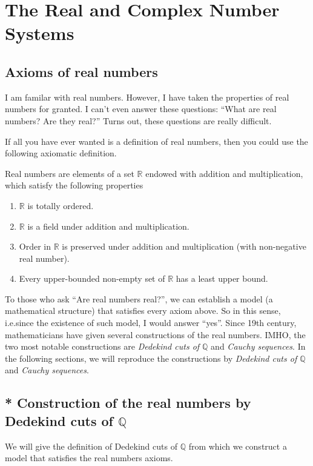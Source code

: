 \chapter{The Real and Complex Number Systems}

\section{Axioms of real numbers}

I am familar with real numbers. However, I have taken the properties of real numbers for granted. I can't even answer these questions: ``What are real numbers? Are they real?\@'' Turns out, these questions are really difficult.

If all you have ever wanted is a definition of real numbers, then you could use the following axiomatic definition.

Real numbers are elements of a set $\mathbb{R}$ endowed with addition and multiplication, which satisfy the following properties
\begin{enumerate}[label = (\roman*)]
    \item $\mathbb{R}$ is totally ordered.
    \item $\mathbb{R}$ is a field under addition and multiplication.
    \item Order in $\mathbb{R}$ is preserved under addition and multiplication (with non-negative real number).
    \item Every upper-bounded non-empty set of $\mathbb{R}$ has a least upper bound.
\end{enumerate}

To those who ask ``Are real numbers real?\@'', we can establish a model (a mathematical structure) that satisfies every axiom above. So in this sense, i.e.\@ since the existence of such model, I would answer ``yes''. Since 19th century, mathematicians have given several constructions of the real numbers. IMHO, the two most notable constructions are \textit{Dedekind cuts of $\mathbb{Q}$} and \textit{Cauchy sequences}. In the following sections, we will reproduce the constructions by \textit{Dedekind cuts of $\mathbb{Q}$} and \textit{Cauchy sequences}.

\section{* Construction of the real numbers by Dedekind cuts of $\mathbb{Q}$}

We will give the definition of Dedekind cuts of $\mathbb{Q}$ from which we construct a model that satisfies the real numbers axioms.

